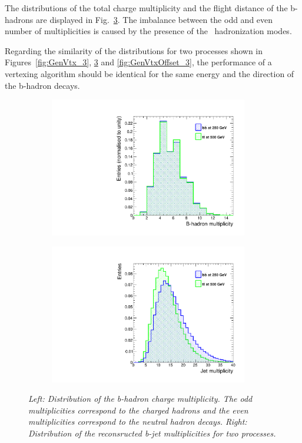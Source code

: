The distributions of the total charge multiplicity and the flight distance of the b-hadrons are displayed in Fig.~\ref{fig:GenHadronParams_3}.
The imbalance between the odd and even number of multiplicities is caused by the presence of the \Bzs\ hadronization modes.

Regarding the similarity of the distributions for two processes shown in Figures~\ref{fig:GenVtx_3}, \ref{fig:GenHadronParams_3} and \ref{fig:GenVtxOffset_3}, the performance of a vertexing algorithm should be identical for the same energy and the direction of the b-hadron decays.


\begin{figure}[h]
\centering
\begin{subfigure}{0.5\textwidth}
    \includegraphics[width=0.95\textwidth]{ILD/plots/gen-hadron-multiplicity.pdf}
\caption{\label{fig:GenHadronParams_a_3} }
\end{subfigure}%
  \begin{subfigure}{0.5\textwidth}
\centering
    \includegraphics[width=0.95\textwidth]{ILD/plots/jet-multi.pdf}
\caption{\label{fig:GenHadronParams_b_3} }
\end{subfigure}
    \caption{\sl Left: Distribution of the b-hadron charge multiplicity. The odd multiplicities correspond to the charged hadrons and the even multiplicities correspond to the neutral hadron decays. Right: Distribution of the reconsructed b-jet multiplicities for two processes. }
    \label{fig:GenHadronParams_3}
\end{figure}


